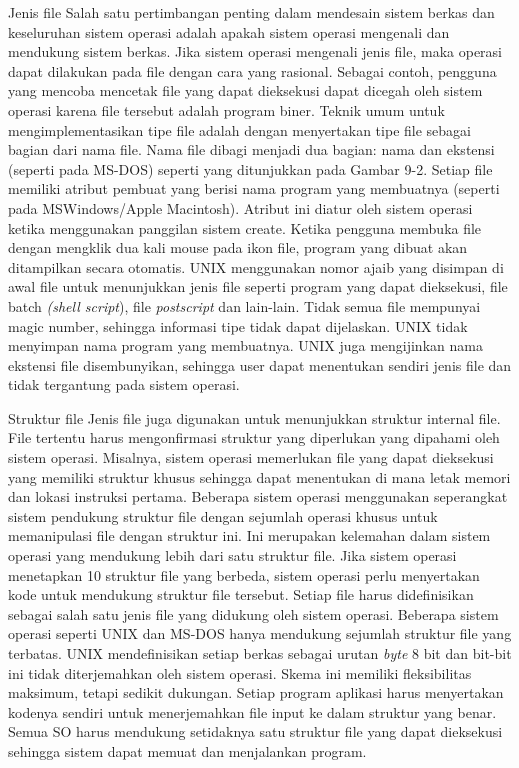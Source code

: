 \documentclass[12pt]{article}
\begin{document}
\begin{itemize}
      Jenis file 
      Salah satu pertimbangan penting dalam mendesain sistem berkas dan keseluruhan sistem operasi adalah apakah sistem operasi mengenali dan mendukung sistem berkas. Jika sistem operasi mengenali jenis file, maka operasi dapat dilakukan pada file dengan cara yang rasional. Sebagai contoh, pengguna yang mencoba mencetak file yang dapat dieksekusi dapat dicegah oleh sistem operasi karena file tersebut adalah program biner. Teknik umum untuk mengimplementasikan tipe file adalah dengan menyertakan tipe file sebagai bagian dari nama file. Nama file dibagi menjadi dua bagian: nama dan ekstensi (seperti pada MS-DOS) seperti yang ditunjukkan pada Gambar 9-2. Setiap file memiliki atribut pembuat yang berisi nama program yang membuatnya (seperti pada MSWindows/Apple Macintosh). Atribut ini diatur oleh sistem operasi ketika menggunakan panggilan sistem create. Ketika pengguna membuka file dengan mengklik dua kali mouse pada ikon file, program yang dibuat akan ditampilkan secara otomatis. UNIX menggunakan nomor ajaib yang disimpan di awal file untuk menunjukkan jenis file seperti program yang dapat dieksekusi, file batch \textit{(shell script}), file \textit{postscript} dan lain-lain. Tidak semua file mempunyai magic number, sehingga informasi tipe tidak dapat dijelaskan. UNIX tidak menyimpan nama program yang membuatnya. UNIX juga mengijinkan nama ekstensi file disembunyikan, sehingga user dapat menentukan sendiri jenis file dan tidak tergantung pada sistem operasi. 

      Struktur file 
      Jenis file juga digunakan untuk menunjukkan struktur internal file. File tertentu harus mengonfirmasi struktur yang diperlukan yang dipahami oleh sistem operasi. Misalnya, sistem operasi memerlukan file yang dapat dieksekusi yang memiliki struktur khusus sehingga dapat menentukan di mana letak memori dan lokasi instruksi pertama. Beberapa sistem operasi menggunakan seperangkat sistem pendukung struktur file dengan sejumlah operasi khusus untuk memanipulasi file dengan struktur ini. Ini merupakan kelemahan dalam sistem operasi yang mendukung lebih dari satu struktur file. Jika sistem operasi menetapkan 10 struktur file yang berbeda, sistem operasi perlu menyertakan kode untuk mendukung struktur file tersebut. Setiap file harus didefinisikan sebagai salah satu jenis file yang didukung oleh sistem operasi. Beberapa sistem operasi seperti UNIX dan MS-DOS hanya mendukung sejumlah struktur file yang terbatas. UNIX mendefinisikan setiap berkas sebagai urutan \textit{byte} 8 bit dan bit-bit ini tidak diterjemahkan oleh sistem operasi. Skema ini memiliki fleksibilitas maksimum, tetapi sedikit dukungan. Setiap program aplikasi harus menyertakan kodenya sendiri untuk menerjemahkan file input ke dalam struktur yang benar. Semua SO harus mendukung setidaknya satu struktur file yang dapat dieksekusi sehingga sistem dapat memuat dan menjalankan program. 


\end{itemize}
\end{document}
